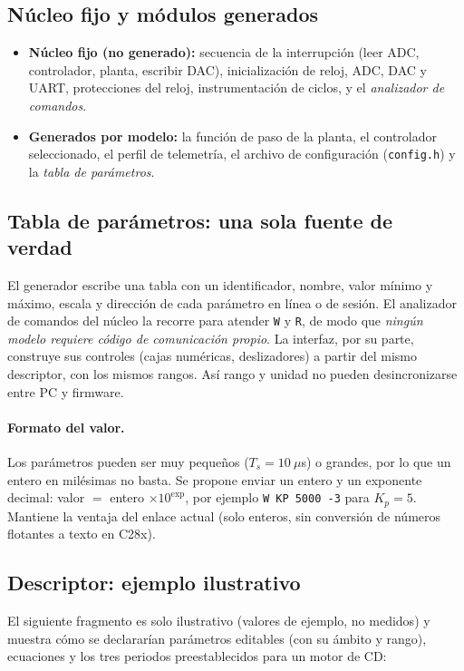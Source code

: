 \documentclass[12pt,letterpaper]{article}
\begin{document}
\subsection{Núcleo fijo y módulos generados}

\begin{itemize}
    \item \textbf{Núcleo fijo (no generado):} secuencia de la interrupción (leer ADC, controlador, planta, escribir DAC), inicialización de reloj, ADC, DAC y UART, protecciones del reloj, instrumentación de ciclos, y el \emph{analizador de comandos}.
    \item \textbf{Generados por modelo:} la función de paso de la planta, el controlador seleccionado, el perfil de telemetría, el archivo de configuración (\texttt{config.h}) y la \emph{tabla de parámetros}.
\end{itemize}

\subsection{Tabla de parámetros: una sola fuente de verdad}

El generador escribe una tabla con un identificador, nombre, valor mínimo y máximo, escala y dirección de cada parámetro en línea o de sesión. El analizador de comandos del núcleo la recorre para atender \texttt{W} y \texttt{R}, de modo que \emph{ningún modelo requiere código de comunicación propio}. La interfaz, por su parte, construye sus controles (cajas numéricas, deslizadores) a partir del mismo descriptor, con los mismos rangos. Así rango y unidad no pueden desincronizarse entre PC y firmware.

\paragraph{Formato del valor.} Los parámetros pueden ser muy pequeños ($T_s=10~\mu$s) o grandes, por lo que un entero en milésimas no basta. Se propone enviar un entero y un exponente decimal: valor $=$ entero $\times 10^{\text{exp}}$, por ejemplo \texttt{W KP 5000 -3} para $K_p=5$. Mantiene la ventaja del enlace actual (solo enteros, sin conversión de números flotantes a texto en C28x).

\subsection{Descriptor: ejemplo ilustrativo}

El siguiente fragmento es solo ilustrativo (valores de ejemplo, no medidos) y muestra cómo se declararían parámetros editables (con su ámbito y rango), ecuaciones y los tres periodos preestablecidos para un motor de CD:
\end{document}
